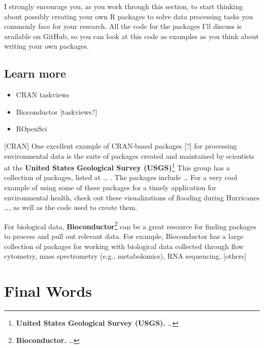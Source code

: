\documentclass[]{tufte-book}
\providecommand{\tightlist}{%
  \setlength{\itemsep}{0pt}\setlength{\parskip}{0pt}}
\begin{document}
I strongly encourage you, as you work through this section, to start thinking about possibly
creating your own R packages to solve data processing tasks you commonly face for your research.
All the code for the packages I'll discuss is available on GitHub, so you can look at this code
as examples as you think about writing your own packages.

\hypertarget{learn-more-4}{%
\section{Learn more}\label{learn-more-4}}

\begin{itemize}
\tightlist
\item
  CRAN taskviews
\item
  Bioconductor {[}taskviews?{]}
\item
  ROpenSci
\end{itemize}

{[}CRAN{]} One excellent example of CRAN-based packages {[}?{]} for processing environmental
data is the suite of packages created and maintained by scientists at the \textbf{United States
Geological Survey (USGS)}\footnote{\textbf{United States Geological Survey (USGS).} \ldots{}}
This group has a collection of packages, listed at \ldots{} . The packages include \ldots{}
For a very cool example of using some of these packages for a timely application for
environmental health, check out these visualizations of flooding during Hurricanes \ldots{},
as well as the code used to create them.

For biological data, \textbf{Bioconductor}\footnote{\textbf{Bioconductor.} \ldots{}} can be a great
resource for finding packages to process and pull out relevant data. For example,
Bioconductor has a large collection of packages for working with biological data collected
through flow cytometry, mass spectrometry (e.g., metabolomics), RNA sequencing, {[}others{]}

\hypertarget{final-words}{%
\chapter{Final Words}\label{final-words}}


\end{document}
